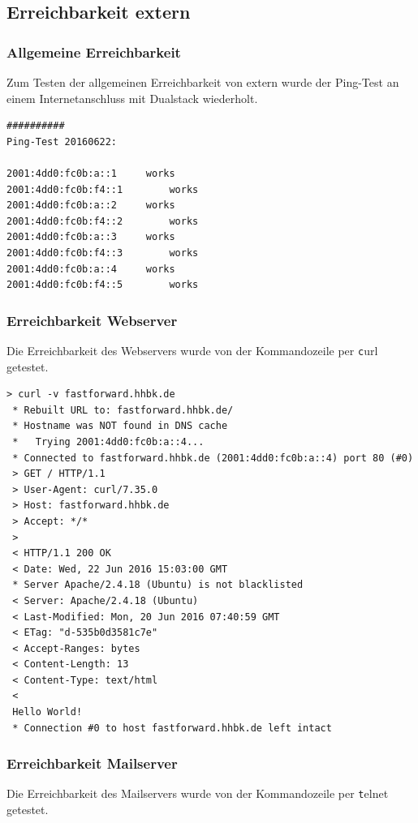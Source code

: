 \subsection{Erreichbarkeit extern}

\subsubsection{Allgemeine Erreichbarkeit}

Zum Testen der allgemeinen Erreichbarkeit von extern wurde der Ping-Test an einem Internetanschluss mit Dualstack wiederholt.

\begin{lstlisting}
##########
Ping-Test 20160622:

2001:4dd0:fc0b:a::1		works
2001:4dd0:fc0b:f4::1		works
2001:4dd0:fc0b:a::2		works
2001:4dd0:fc0b:f4::2		works
2001:4dd0:fc0b:a::3		works
2001:4dd0:fc0b:f4::3		works
2001:4dd0:fc0b:a::4		works
2001:4dd0:fc0b:f4::5		works
\end{lstlisting}

\subsubsection{Erreichbarkeit Webserver}

Die Erreichbarkeit des Webservers wurde von der Kommandozeile per {\texttt curl} getestet.

\begin{lstlisting}[numbers=none]
> curl -v fastforward.hhbk.de
 * Rebuilt URL to: fastforward.hhbk.de/
 * Hostname was NOT found in DNS cache
 *   Trying 2001:4dd0:fc0b:a::4...
 * Connected to fastforward.hhbk.de (2001:4dd0:fc0b:a::4) port 80 (#0)
 > GET / HTTP/1.1
 > User-Agent: curl/7.35.0
 > Host: fastforward.hhbk.de
 > Accept: */*
 > 
 < HTTP/1.1 200 OK
 < Date: Wed, 22 Jun 2016 15:03:00 GMT
 * Server Apache/2.4.18 (Ubuntu) is not blacklisted
 < Server: Apache/2.4.18 (Ubuntu)
 < Last-Modified: Mon, 20 Jun 2016 07:40:59 GMT
 < ETag: "d-535b0d3581c7e"
 < Accept-Ranges: bytes
 < Content-Length: 13
 < Content-Type: text/html
 < 
 Hello World!
 * Connection #0 to host fastforward.hhbk.de left intact
\end{lstlisting}

\subsubsection{Erreichbarkeit Mailserver}

Die Erreichbarkeit des Mailservers wurde von der Kommandozeile per {\texttt telnet} getestet.


